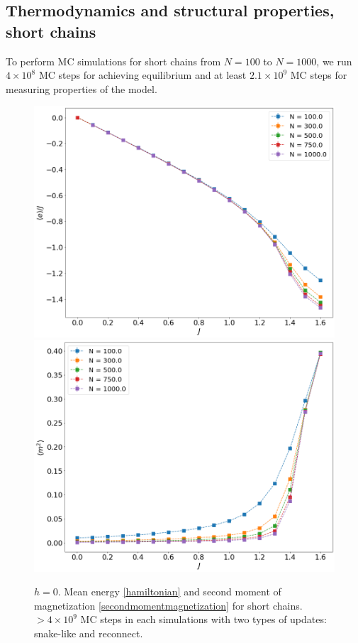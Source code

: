 \subsection{Thermodynamics and structural properties, short chains}
To perform MC simulations for short chains from $N=100$ to $N=1000$, we run $4 \times 10^8$ MC steps for achieving equilibrium and at least $2.1 \times 10^9$ MC steps for measuring properties of the model.
 \begin{figure}[H]
	\centering
	\includegraphics[scale=0.21]{Images/energy_shortchains.png}
	\includegraphics[scale=0.21]{Images/magnetization2_shortchains.png}
	\caption{$h=0$. Mean energy \eqref{hamiltonian} and   second moment of magnetization \eqref{secondmomentmagnetization} for short chains. $ > 4 \times 10^{9} $ MC steps in each simulations with two  types of updates: snake-like and reconnect.    }
	\label{fig:energymagshort}
\end{figure}


